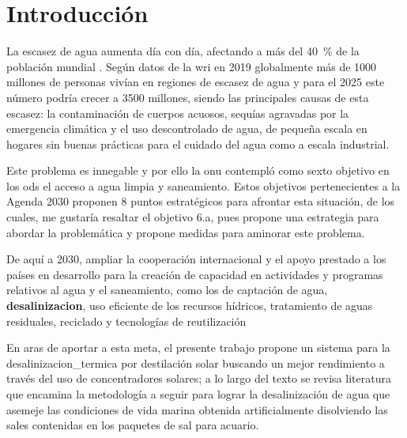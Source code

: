 \chapter{Introducción}
	
	La escasez de agua aumenta día con día, afectando a más del \qty{40}{\percent} de la población mundial \cite{pnud_objetivo_nodate}. Según datos de la \acrfull{wri} en 2019 globalmente más de 1000 millones de personas vivían en regiones de escasez de agua y para el 2025 este número podría crecer a 3500 millones, siendo las principales causas de esta escasez: la contaminación de cuerpos acuosos, sequías agravadas por la emergencia climática y el uso descontrolado de agua, de pequeña escala en hogares sin buenas prácticas para el cuidado del agua como a escala industrial.
	
	Este problema es innegable y por ello la \acrfull{onu} contempló como sexto objetivo en los \acrfull{ods} el acceso a agua limpia y saneamiento. Estos objetivos pertenecientes a la Agenda 2030 proponen 8 puntos estratégicos para afrontar esta situación, de los cuales, me gustaría resaltar el objetivo 6.a, pues propone una estrategia para abordar la problemática y propone medidas para aminorar este problema.
	
	\begin{displayquote}[][.]
		De aquí a 2030, ampliar la cooperación internacional y el apoyo prestado a los países en desarrollo para la creación de capacidad en actividades y programas relativos al agua y el saneamiento, como los de captación de agua, \textbf{\gls{desalinizacion}}, uso eficiente de los recursos hídricos, tratamiento de aguas residuales, reciclado y tecnologías de reutilización \cite{naciones_unidas_sustainable_nodate}
	\end{displayquote}

	En aras de aportar a esta meta, el presente trabajo propone un sistema para la \gls{desalinizacion_termica} por destilación solar buscando un mejor rendimiento a través del uso de concentradores solares; a lo largo del texto se revisa literatura que encamina la metodología a seguir para lograr la desalinización de agua que asemeje las condiciones de vida marina obtenida artificialmente disolviendo las sales contenidas en los paquetes de sal para acuario.
	
	
	